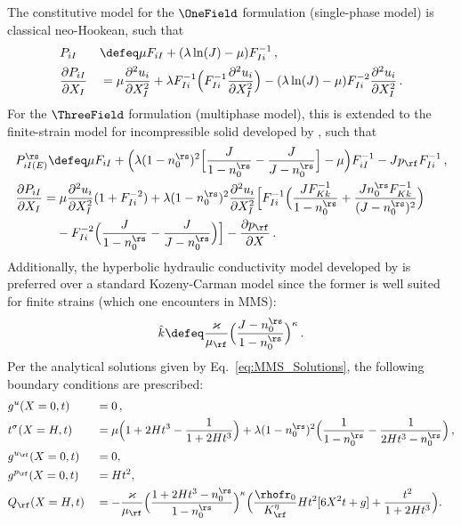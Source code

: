 The constitutive model for the $\OneField$ formulation (single-phase model) is classical neo-Hookean, such that
\begin{align}
    \begin{aligned}
        &P_{iI} &&\defeq \mu F_{iI} + (\lambda\ln(J) - \mu)F_{Ii}^{-1}\, ,\\
        &\frac{\partial P_{iI}}{\partial X_I} &&= \mu\frac{\partial^2 u_i}{\partial X_I^2} + \lambda F_{Ii}^{-1}\Big(F_{Ii}^{-1}\frac{\partial^2 u_i}{\partial X_I^2}\Big) - (\lambda\ln(J) - \mu)F_{Ii}^{-2}\frac{\partial^2 u_i}{\partial X_I^2}\, .
    \end{aligned}
\end{align}
For the $\ThreeField$ formulation (multiphase model), this is extended to the finite-strain model for incompressible solid developed by \citet{Ehlers-Eipper1999}, such that
\begin{align}
    \begin{aligned}
		&P_{iI(E)}^\rs \defeq \mu F_{iI} + \Big(\lambda(1 - n_0^\rs)^2\Big[\dfrac{J}{1 - n_{0}^\rs} - \dfrac{J}{J - n_{0}^\rs}\Big] - \mu\Big)F_{iI}^{-1} - Jp_\rf F_{Ii}^{-1}\, ,\\
        &\frac{\partial P_{iI}}{\partial X_I} = \mu\frac{\partial^2 u_i}{\partial X_I^2}(1 + F_{Ii}^{-2}) + \lambda(1 - n_0^\rs)^2\frac{\partial^2 u_i}{\partial X_I^2}\Big[F_{Ii}^{-1}\Big(\frac{J F_{Kk}^{-1}}{1 - n_0^\rs} + \frac{Jn_0^\rs F_{Kk}^{-1}}{(J - n_0^\rs)^2}\Big)\\
        &\phantom{\frac{\partial P_{iI}}{\partial X_I} =} - F_{Ii}^{-2}\Big(\frac{J}{1 - n_0^\rs} - \frac{J}{J - n_0^\rs}\Big)\Big] - \frac{\partial p_\rf}{\partial X}\, .
    \end{aligned}
\end{align}
Additionally, the hyperbolic hydraulic conductivity model developed by \citet{Markert2005} is preferred over a standard Kozeny-Carman model since the former is well suited for finite strains (which one encounters in MMS):
\begin{align}
    \hat{k} \defeq \frac{\varkappa}{\mu_\rf}\Big(\frac{J - n_0^\rs}{1 - n_0^\rs}\Big)^\kappa\, .
\end{align}
Per the analytical solutions given by Eq.~\eqref{eq:MMS_Solutions}, the following boundary conditions are prescribed:
{\footnotesize
\begin{align}
\label{eq:MMS-BCs-1D}
    \begin{aligned}
        &g^u(X=0,t) &&= 0\, ,\\
        &t^\sigma(X = H,t) &&= \mu\Big(1 + 2Ht^3 - \frac{1}{1 + 2Ht^3}\Big) + \lambda(1 - n_0^\rs)^2\Big(\frac{1}{1 - n_0^\rs} - \frac{1}{2Ht^3 - n_0^\rs}\Big) \, ,\\
        &g^{u_\rf}(X = 0,t) &&= 0 ,\\
        &g^{p_\rf}(X = 0,t) &&= Ht^2 ,\\
        &Q_\rf(X = H,t) &&=  -\frac{\varkappa}{\mu_\rf}\Big(\frac{1 + 2Ht^3 - n_0^\rs}{1 - n_0^\rs}\Big)^\kappa\Big(\frac{\rhofr_0}{K_\rf^\eta}Ht^2[6X^2t + g] + \frac{t^2}{1 + 2Ht^3}\Big).
    \end{aligned}
\end{align}}%

